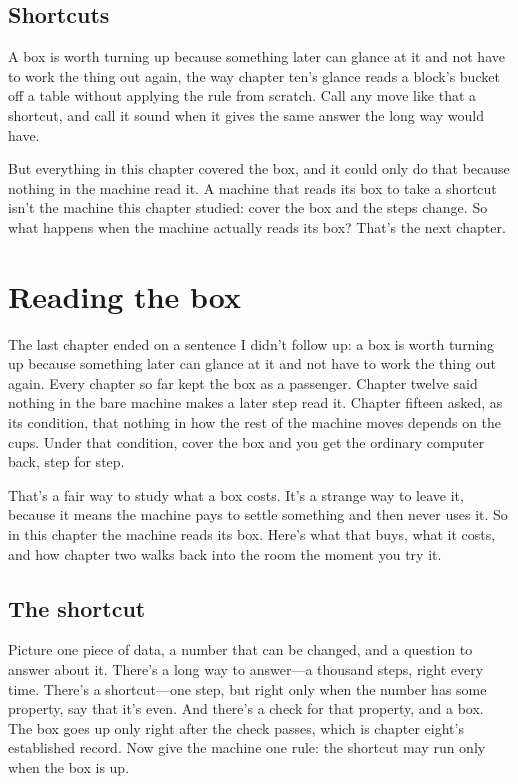 \documentclass[11pt,twoside]{article}
\theoremstyle{thielethm}
\theoremstyle{thieledef}
\theoremstyle{thieledef}
\theoremstyle{thieledef}
\theoremstyle{thielethm}
\theoremstyle{thieleobs}
\theoremstyle{thielethm}
\begin{document}
\subsection{Shortcuts}

A box is worth turning up because something later can glance at it and not have to work the thing out again, the way chapter ten's glance reads a block's bucket off a table without applying the rule from scratch. Call any move like that a shortcut, and call it sound when it gives the same answer the long way would have.

But everything in this chapter covered the box, and it could only do that because nothing in the machine read it. A machine that reads its box to take a shortcut isn't the machine this chapter studied: cover the box and the steps change. So what happens when the machine actually reads its box? That's the next chapter.

\section{Reading the box}
\label{sec:reading-box}

The last chapter ended on a sentence I didn't follow up: a box is worth turning up because something later can glance at it and not have to work the thing out again. Every chapter so far kept the box as a passenger. Chapter twelve said nothing in the bare machine makes a later step read it. Chapter fifteen asked, as its condition, that nothing in how the rest of the machine moves depends on the cups. Under that condition, cover the box and you get the ordinary computer back, step for step.

That's a fair way to study what a box costs. It's a strange way to leave it, because it means the machine pays to settle something and then never uses it. So in this chapter the machine reads its box. Here's what that buys, what it costs, and how chapter two walks back into the room the moment you try it.

\subsection{The shortcut}

Picture one piece of data, a number that can be changed, and a question to answer about it. There's a long way to answer---a thousand steps, right every time. There's a shortcut---one step, but right only when the number has some property, say that it's even. And there's a check for that property, and a box. The box goes up only right after the check passes, which is chapter eight's established record. Now give the machine one rule: the shortcut may run only when the box is up.
\end{document}
